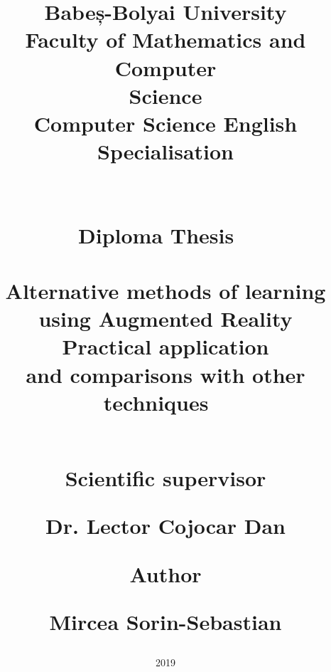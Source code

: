 \documentclass[12 pct]{report}
\begin{document}
\begin{titlepage}
\title{\vspace{-3.5cm}
  { \huge Babeș-Bolyai University\\
  Faculty of Mathematics and Computer\\
  Science\\
  Computer Science English Specialisation \\
  }
  \ \\
  \ \\
  {\huge \textbf{Diploma Thesis}}
  \ \\
  \ \\
  \textbf{Alternative methods of learning using Augmented Reality\\
  Practical application \\
    and comparisons with other techniques
  }
  \ \\
  \ \\
  {%
    \begin{flushleft}%
  	 Scientific supervisor
  	\end{flushleft}
  	\begin{flushleft}%
  	 Dr. Lector Cojocar Dan
  	\end{flushleft}}
  {%
  \begin{flushright}
  	Author
  \end{flushright}
  \begin{flushright}
  	Mircea Sorin-Sebastian
  \end{flushright} }
}%
\date{2019\\}
\maketitle
\end{titlepage}
\end{document}
